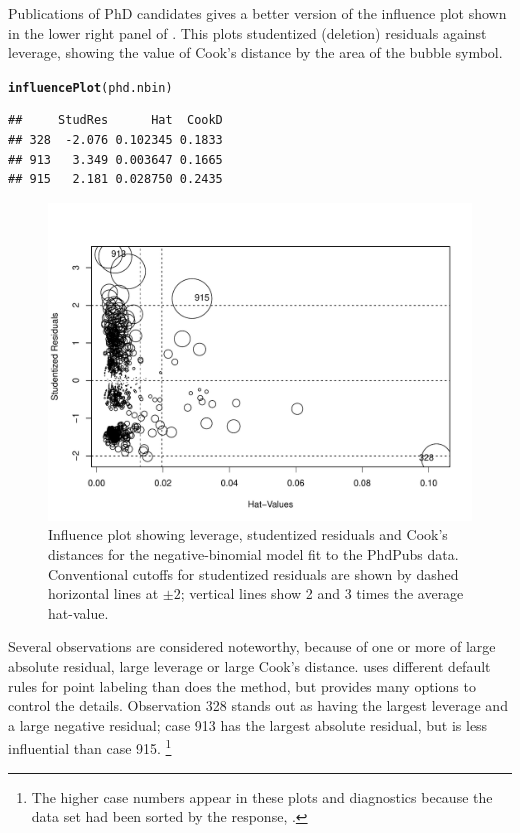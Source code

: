 \documentclass[11pt]{book}\usepackage[]{graphicx}\usepackage[]{color}
\makeatletter
\newcommand{\hlstd}[1]{\textcolor[rgb]{0.345,0.345,0.345}{#1}}%
\newcommand{\hlkwd}[1]{\textcolor[rgb]{0.737,0.353,0.396}{\textbf{#1}}}%
\newenvironment{kframe}{%
 \def\at@end@of@kframe{}%
 \ifinner\ifhmode%
  \def\at@end@of@kframe{\end{minipage}}%
  \begin{minipage}{\columnwidth}%
 \fi\fi%
 \def\FrameCommand##1{\hskip\@totalleftmargin \hskip-\fboxsep
 \colorbox{shadecolor}{##1}\hskip-\fboxsep
     \hskip-\linewidth \hskip-\@totalleftmargin \hskip\columnwidth}%
 \MakeFramed {\advance\hsize-\width
   \@totalleftmargin\z@ \linewidth\hsize
   \@setminipage}}%
 {\par\unskip\endMakeFramed%
 \at@end@of@kframe}
\newenvironment{knitrout}{}{} %
\renewenvironment{knitrout}{\small\renewcommand{\baselinestretch}{.85}}{} %
\makeatother
\begin{document}
\begin{Example}[phdpubs5]{Publications of PhD candidates}
 gives a better version of the influence plot shown in the lower right
panel of .
This plots studentized (deletion) residuals against leverage, showing
the value of Cook's distance by the area of the bubble symbol.  
\begin{knitrout}
\color{fgcolor}\begin{kframe}
\begin{alltt}
\hlkwd{influencePlot}\hlstd{(phd.nbin)}
\end{alltt}
\begin{verbatim}
##     StudRes      Hat  CookD
## 328  -2.076 0.102345 0.1833
## 913   3.349 0.003647 0.1665
## 915   2.181 0.028750 0.2435
\end{verbatim}
\end{kframe}\begin{figure}[!htbp]


\centerline{\includegraphics[width=.7\textwidth]{ch09/fig/phdpubs5-influenceplot} }

\caption[Influence plot showing leverage, studentized residuals and Cook's distances for the negative-binomial model fit to the PhdPubs data]{Influence plot showing leverage, studentized residuals and Cook's distances for the negative-binomial model fit to the PhdPubs data. Conventional cutoffs for studentized residuals are shown by dashed horizontal lines at $\pm 2$; vertical lines show 2 and 3 times the average hat-value.\label{fig:phdpubs5-influenceplot}}
\end{figure}


\end{knitrout}
Several observations are considered noteworthy, because of one or more of large absolute residual, large leverage or
large Cook's distance.  uses different default rules for point labeling than does the
 method, but provides many options to control the details. 
Observation 328 stands out as having the largest leverage and a large negative residual;
case 913 has the largest absolute residual, but is less influential than case 915.%
\footnote{
The higher case numbers appear in these plots and diagnostics because the data set  had been sorted
by the response, .
}


\end{Example}
\end{document}
